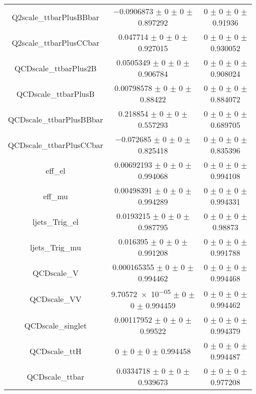 \begin{table}
\begin{tabular}{ccc}
Q2scale\_ttbarPlusBBbar & \num{-0.0906873} $\pm$ \num{0} $\pm$ \num{0} $\pm$ \num{0.897292} & \num{0} $\pm$ \num{0} $\pm$ \num{0} $\pm$ \num{0.91936}\\
Q2scale\_ttbarPlusCCbar & \num{0.047714} $\pm$ \num{0} $\pm$ \num{0} $\pm$ \num{0.927015} & \num{0} $\pm$ \num{0} $\pm$ \num{0} $\pm$ \num{0.930052}\\
QCDscale\_ttbarPlus2B & \num{0.0505349} $\pm$ \num{0} $\pm$ \num{0} $\pm$ \num{0.906784} & \num{0} $\pm$ \num{0} $\pm$ \num{0} $\pm$ \num{0.908024}\\
QCDscale\_ttbarPlusB & \num{0.00798578} $\pm$ \num{0} $\pm$ \num{0} $\pm$ \num{0.88422} & \num{0} $\pm$ \num{0} $\pm$ \num{0} $\pm$ \num{0.884072}\\
QCDscale\_ttbarPlusBBbar & \num{0.218854} $\pm$ \num{0} $\pm$ \num{0} $\pm$ \num{0.557293} & \num{0} $\pm$ \num{0} $\pm$ \num{0} $\pm$ \num{0.689705}\\
QCDscale\_ttbarPlusCCbar & \num{-0.072685} $\pm$ \num{0} $\pm$ \num{0} $\pm$ \num{0.825418} & \num{0} $\pm$ \num{0} $\pm$ \num{0} $\pm$ \num{0.835396}\\
eff\_el & \num{0.00692193} $\pm$ \num{0} $\pm$ \num{0} $\pm$ \num{0.994068} & \num{0} $\pm$ \num{0} $\pm$ \num{0} $\pm$ \num{0.994108}\\
eff\_mu & \num{0.00498391} $\pm$ \num{0} $\pm$ \num{0} $\pm$ \num{0.994289} & \num{0} $\pm$ \num{0} $\pm$ \num{0} $\pm$ \num{0.994331}\\
ljets\_Trig\_el & \num{0.0193215} $\pm$ \num{0} $\pm$ \num{0} $\pm$ \num{0.987795} & \num{0} $\pm$ \num{0} $\pm$ \num{0} $\pm$ \num{0.98873}\\
ljets\_Trig\_mu & \num{0.016395} $\pm$ \num{0} $\pm$ \num{0} $\pm$ \num{0.991208} & \num{0} $\pm$ \num{0} $\pm$ \num{0} $\pm$ \num{0.991788}\\
QCDscale\_V & \num{0.000165355} $\pm$ \num{0} $\pm$ \num{0} $\pm$ \num{0.994462} & \num{0} $\pm$ \num{0} $\pm$ \num{0} $\pm$ \num{0.994468}\\
QCDscale\_VV & \num{9.70572e-05} $\pm$ \num{0} $\pm$ \num{0} $\pm$ \num{0.994459} & \num{0} $\pm$ \num{0} $\pm$ \num{0} $\pm$ \num{0.994462}\\
QCDscale\_singlet & \num{0.00117952} $\pm$ \num{0} $\pm$ \num{0} $\pm$ \num{0.99522} & \num{0} $\pm$ \num{0} $\pm$ \num{0} $\pm$ \num{0.994379}\\
QCDscale\_ttH & \num{0} $\pm$ \num{0} $\pm$ \num{0} $\pm$ \num{0.994458} & \num{0} $\pm$ \num{0} $\pm$ \num{0} $\pm$ \num{0.994487}\\
QCDscale\_ttbar & \num{0.0334718} $\pm$ \num{0} $\pm$ \num{0} $\pm$ \num{0.939673} & \num{0} $\pm$ \num{0} $\pm$ \num{0} $\pm$ \num{0.977208}\\

\end{tabular}
\end{table}
